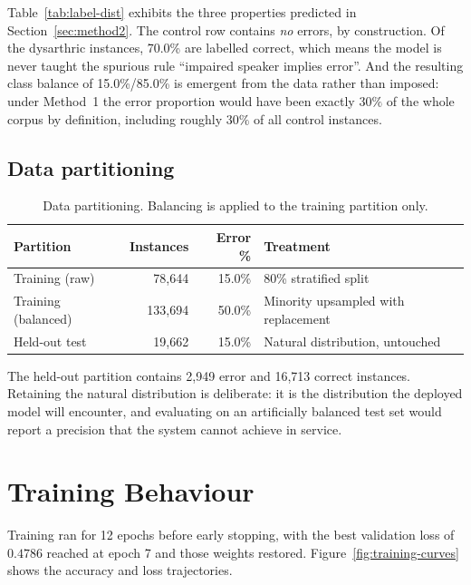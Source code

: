 Table~\ref{tab:label-dist} exhibits the three properties predicted in
Section~\ref{sec:method2}. The control row contains \emph{no} errors, by
construction. Of the dysarthric instances, 70.0\% are labelled correct, which
means the model is never taught the spurious rule ``impaired speaker implies
error''. And the resulting class balance of 15.0\%/85.0\% is emergent from the
data rather than imposed: under Method~1 the error proportion would have been
exactly $30\%$ of the whole corpus by definition, including roughly
$30\%$ of all control instances.

\subsection{Data partitioning}

\begin{table}[H]
\centering
\caption[Data partitioning]{Data partitioning. Balancing is applied to the
training partition only.}
\label{tab:split}
\small
\begin{tabular}{@{}lrrp{5.4cm}@{}}
\toprule
\textbf{Partition} & \textbf{Instances} & \textbf{Error \%} & \textbf{Treatment} \\
\midrule
Training (raw)      & 78{,}644  & 15.0\% & 80\% stratified split \\
Training (balanced) & 133{,}694 & 50.0\% & Minority upsampled with replacement \\
Held-out test       & 19{,}662  & 15.0\% & Natural distribution, untouched \\
\bottomrule
\end{tabular}
\end{table}

The held-out partition contains 2{,}949 error and 16{,}713 correct instances.
Retaining the natural distribution is deliberate: it is the distribution the
deployed model will encounter, and evaluating on an artificially balanced test
set would report a precision that the system cannot achieve in service.

\section{Training Behaviour}
\label{sec:res-training}

Training ran for 12 epochs before early stopping, with the best validation loss
of $0.4786$ reached at epoch 7 and those weights restored.
Figure~\ref{fig:training-curves} shows the accuracy and loss trajectories.

